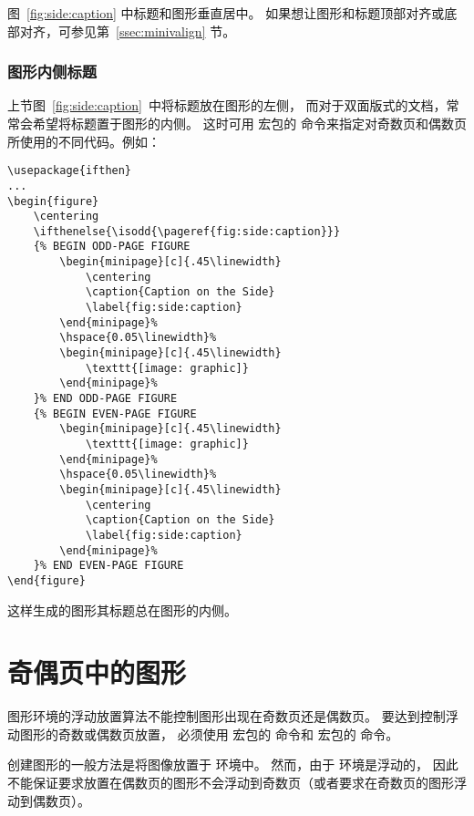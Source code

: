 图~\ref{fig:side:caption} 中标题和图形垂直居中。
如果想让图形和标题顶部对齐或底部对齐，可参见第~\ref{ssec:minivalign} 节。

\subsubsection{图形内侧标题}\label{sssec:bindcaption}

上节图~\ref{fig:side:caption}~中将标题放在图形的左侧，
而对于双面版式的文档，常常会希望将标题置于图形的内侧。
这时可用  宏包的  命令来指定对奇数页和偶数页所使用的不同代码。例如：
\begin{lstlisting}
\usepackage{ifthen}
...
\begin{figure}
	\centering
	\ifthenelse{\isodd{\pageref{fig:side:caption}}}
	{% BEGIN ODD-PAGE FIGURE
		\begin{minipage}[c]{.45\linewidth}
			\centering
			\caption{Caption on the Side}
			\label{fig:side:caption}
		\end{minipage}%
		\hspace{0.05\linewidth}%
		\begin{minipage}[c]{.45\linewidth}
			\texttt{[image: graphic]}
		\end{minipage}%
	}% END ODD-PAGE FIGURE
	{% BEGIN EVEN-PAGE FIGURE
		\begin{minipage}[c]{.45\linewidth}
			\texttt{[image: graphic]}
		\end{minipage}%
		\hspace{0.05\linewidth}%
		\begin{minipage}[c]{.45\linewidth}
			\centering
			\caption{Caption on the Side}
			\label{fig:side:caption}
		\end{minipage}%
	}% END EVEN-PAGE FIGURE
\end{figure}
\end{lstlisting}
这样生成的图形其标题总在图形的内侧。


\section{奇偶页中的图形}\label{sec:evenoddpage}

图形环境的浮动放置算法不能控制图形出现在奇数页还是偶数页。
要达到控制浮动图形的奇数或偶数页放置，
必须使用  宏包的  命令和  宏包的  命令。

创建图形的一般方法是将图像放置于  环境中。
然而，由于  环境是浮动的，
因此不能保证要求放置在偶数页的图形不会浮动到奇数页（或者要求在奇数页的图形浮动到偶数页）。

